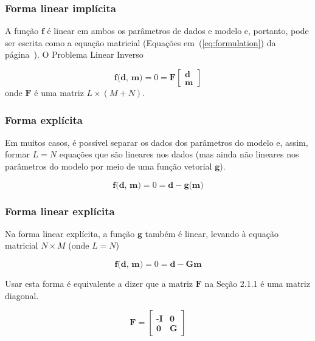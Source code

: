 \documentclass[a4paper, 12 pt]{article} %
\begin{document}
\subsubsection{Forma linear implícita}

A função $\textbf{f}$ é linear em ambos os parâmetros de dados e modelo e, portanto, pode ser escrita como a equação matricial (Equações em~(\ref{eq:formulation}) da página~\pageref{eq:formulation}). O Problema Linear Inverso

\begin{equation}\label{eq:matriz}
\textbf{f(d, m)} = 0 = \textbf{F}
\begin{bmatrix}
\textbf{d} \\
\textbf{m}
\end{bmatrix}
\end{equation}
onde $\textbf{F}$ é uma matriz $L \times (M + N)$.

\subsubsection{Forma explícita}

Em muitos casos, é possível separar os dados dos parâmetros do modelo e, assim, formar $L = N$ equações que são lineares nos dados (mas ainda não lineares nos parâmetros do modelo por meio de uma função vetorial $\textbf{g}$).

\begin{equation}\label{eq:forma_explicita}
\textbf{f(d, m)} = 0 = \textbf{d} - \textbf{g(m)}
\end{equation}

\subsubsection{Forma linear explícita}

Na forma linear explícita, a função $\textbf{g}$ também é linear, levando à equação matricial $N \times M$ (onde $L = N$)

\begin{equation}\label{eq:forma_linear_explicita}
\textbf{f(d, m)} = 0 = \textbf{d} - \textbf{Gm}
\end{equation}

Usar esta forma é equivalente a dizer que a matriz $\textbf{F}$ na Seção 2.1.1 é uma matriz diagonal.

\begin{equation}\label{eq:matriz_linear}
\textbf{F} = 
\begin{bmatrix}
\textbf{-I} & \textbf{0}\\
\textbf{0}	&	\textbf{G}
\end{bmatrix}
\end{equation}
\end{document}
